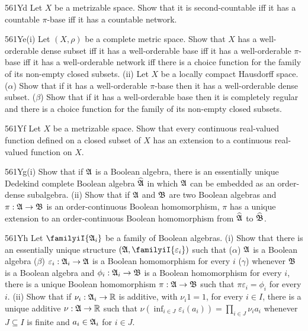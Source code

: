 {\spheader 561Yd Let $X$ be a metrizable space.   Show that it
is second-countable iff it has a countable $\pi$-base
iff it has a countable network.

\spheader 561Ye(i) Let $(X,\rho)$ be a complete metric space.
Show that $X$ has a well-orderable dense subset iff it has a well-orderable
base iff it has a well-orderable $\pi$-base iff it has a well-orderable
network iff there is a choice function
for the family of its non-empty closed subsets.
(ii) Let $X$ be a locally compact Hausdorff space.
($\alpha$) Show that if it
has a well-orderable $\pi$-base then it has a well-orderable dense subset.
($\beta$) Show that if it has a well-orderable base then
it is completely regular and there is a choice
function for the family of its non-empty closed subsets.

\spheader 561Yf Let $X$ be a metrizable space.
Show that every continuous real-valued
function defined on a closed subset of $X$ has an extension to
a continuous real-valued function on $X$.

\spheader 561Yg(i) Show that if $\frak A$ is a Boolean algebra,
there is an essentially unique Dedekind complete Boolean algebra
$\widehat{\frak A}$ in which $\frak A$ can
be embedded as an order-dense subalgebra.   (ii) Show that if $\frak A$ and
$\frak B$ are two Boolean algebras and $\pi:\frak A\to\frak B$ is an
order-continuous Boolean homomorphism, $\pi$ has a unique extension to an
order-continuous Boolean homomorphism from $\widehat{\frak A}$ to
$\widehat{\frak B}$.   

\spheader 561Yh Let $\familyiI{\frak A_i}$ be a family of Boolean algebras.
(i) Show that there is an essentially unique structure
$(\frak A,\familyiI{\varepsilon_i})$ such that ($\alpha$) $\frak A$ is a
Boolean algebra ($\beta$) $\varepsilon_i:\frak A_i\to\frak A$ is a Boolean
homomorphism for every $i$ ($\gamma$) whenever $\frak B$ is a Boolean
algebra
and $\phi_i:\frak A_i\to\frak B$ is a Boolean homomorphism for every $i$,
there is a unique Boolean homomorphism $\pi:\frak A\to\frak B$ such that
$\pi\varepsilon_i=\phi_i$ for every $i$.   (ii) Show that if
$\nu_i:\frak A_i\to\Bbb R$ is additive, with $\nu_i1=1$,
for every $i\in I$, there is a
unique additive $\nu:\frak A\to\Bbb R$ such that
$\nu(\inf_{i\in J}\varepsilon_i(a_i))=\prod_{i\in J}\nu_ia_i$ whenever
$J\subseteq I$ is finite and $a_i\in\frak A_i$ for $i\in J$.

}
